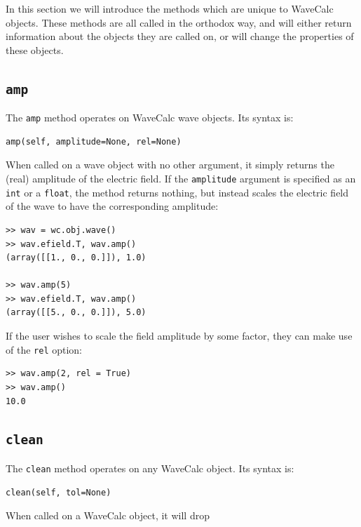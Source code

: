 \documentclass[11pt, reqno]{book}%
\newcounter{ct}
\newcommand{\tw}[1]{{\tt #1}}
\begin{document}
In this section we will introduce the methods which are unique to WaveCalc objects. These methods are all called in the orthodox way, and will either return information about the objects they are called on, or will change the properties of these objects.


\subsection{\tw{amp}}
\label{sec:ampmethod}

The \tw{amp} method operates on WaveCalc wave objects. Its syntax is:
\begin{verbatim}
amp(self, amplitude=None, rel=None)
\end{verbatim}
\noindent When called on a wave object with no other argument, it simply returns the (real) amplitude of the electric field. If the \tw{amplitude} argument is specified as an \tw{int} or a \tw{float}, the method returns nothing, but instead scales the electric field of the wave to have the corresponding amplitude:
\begin{verbatim}
>> wav = wc.obj.wave()
>> wav.efield.T, wav.amp()
(array([[1., 0., 0.]]), 1.0)

>> wav.amp(5)
>> wav.efield.T, wav.amp()
(array([[5., 0., 0.]]), 5.0)
\end{verbatim}
\noindent If the user wishes to scale the field amplitude by some factor, they can make use of the \tw{rel} option:
\begin{verbatim}
>> wav.amp(2, rel = True)
>> wav.amp()
10.0
\end{verbatim}




\subsection{\tw{clean}}
\label{sec:cleanmethod}

The \tw{clean} method operates on any WaveCalc object. Its syntax is:
\begin{verbatim}
clean(self, tol=None)
\end{verbatim}
\noindent When called on a WaveCalc object, it will drop 








\end{document}
